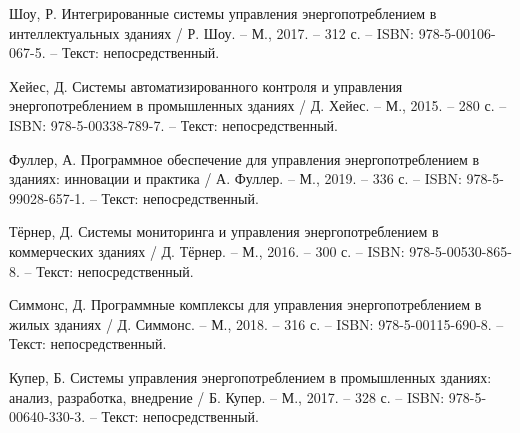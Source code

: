 \begin{thebibliography}{50}
 Шоу, Р. Интегрированные системы управления энергопотреблением в интеллектуальных зданиях / Р. Шоу. – М., 2017. – 312 с. – ISBN: 978-5-00106-067-5. – Текст: непосредственный.

 Хейес, Д. Системы автоматизированного контроля и управления энергопотреблением в промышленных зданиях / Д. Хейес. – М., 2015. – 280 с. – ISBN: 978-5-00338-789-7. – Текст: непосредственный.

 Фуллер, А. Программное обеспечение для управления энергопотреблением в зданиях: инновации и практика / А. Фуллер. – М., 2019. – 336 с. – ISBN: 978-5-99028-657-1. – Текст: непосредственный.

 Тёрнер, Д. Системы мониторинга и управления энергопотреблением в коммерческих зданиях / Д. Тёрнер. – М., 2016. – 300 с. – ISBN: 978-5-00530-865-8. – Текст: непосредственный.

 Симмонс, Д. Программные комплексы для управления энергопотреблением в жилых зданиях / Д. Симмонс. – М., 2018. – 316 с. – ISBN: 978-5-00115-690-8. – Текст: непосредственный.

 Купер, Б. Системы управления энергопотреблением в промышленных зданиях: анализ, разработка, внедрение / Б. Купер. – М., 2017. – 328 с. – ISBN: 978-5-00640-330-3. – Текст: непосредственный.


\end{thebibliography}
